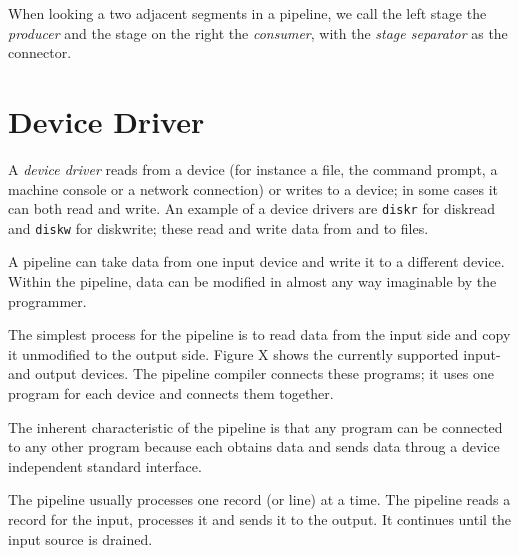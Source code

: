 When looking a two adjacent segments in a pipeline, we call the left
stage the \emph{producer} and the stage on the right the
\emph{consumer}, with the \emph{stage separator} as the connector.
\section{Device Driver}
A \emph{device driver} reads from a device (for instance a file, the
command prompt, a machine console or a network connection) or writes
to a device; in some cases it can both read and write. An example of a
device drivers are \texttt{diskr} for diskread and \texttt{diskw} for
diskwrite; these read and write data from and to files.

A pipeline can take data from one input device and write it to a
different device. Within the pipeline, data can be modified in almost
any way imaginable by the programmer.

The simplest process for the pipeline is to read data from the input
side and copy it unmodified to the output side. Figure X shows the
currently supported input- and output devices. The pipeline compiler
connects these programs; it uses one program for each device and
connects them together.

The inherent characteristic of the pipeline is that any program can be
connected to any other program because each obtains data and sends
data throug a device independent standard interface.

The pipeline usually processes one record (or line) at a time. The
pipeline reads a record for the input, processes it and sends it to
the output. It continues until the input source is drained.



